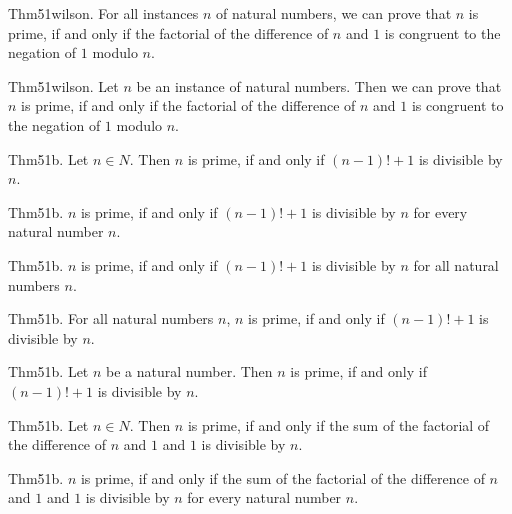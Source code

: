 \documentclass{article}
\begin{document}
Thm51wilson. For all instances $n$ of natural numbers, we can prove that $n$ is prime, if and only if the factorial of the difference of $n$ and $1$ is congruent to the negation of $1$ modulo $n$.

Thm51wilson. Let $n$ be an instance of natural numbers. Then we can prove that $n$ is prime, if and only if the factorial of the difference of $n$ and $1$ is congruent to the negation of $1$ modulo $n$.

Thm51b. Let $n \in N$. Then $n$ is prime, if and only if $(n - 1)! + 1$ is divisible by $n$.

Thm51b. $n$ is prime, if and only if $(n - 1)! + 1$ is divisible by $n$ for every natural number $n$.

Thm51b. $n$ is prime, if and only if $(n - 1)! + 1$ is divisible by $n$ for all natural numbers $n$.

Thm51b. For all natural numbers $n$, $n$ is prime, if and only if $(n - 1)! + 1$ is divisible by $n$.

Thm51b. Let $n$ be a natural number. Then $n$ is prime, if and only if $(n - 1)! + 1$ is divisible by $n$.

Thm51b. Let $n \in N$. Then $n$ is prime, if and only if the sum of the factorial of the difference of $n$ and $1$ and $1$ is divisible by $n$.

Thm51b. $n$ is prime, if and only if the sum of the factorial of the difference of $n$ and $1$ and $1$ is divisible by $n$ for every natural number $n$.
\end{document}
